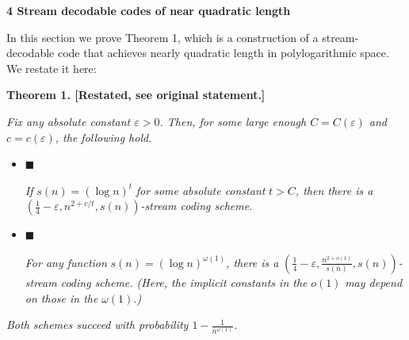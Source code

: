 \documentclass[10pt,a4paper]{article}
\begin{document}
\par\medskip\noindent\textbf{
4 Stream decodable codes of near quadratic length}\par




In this section we prove Theorem 1, which is a construction of a stream-decodable code that achieves nearly quadratic length in polylogarithmic space. We restate it here:\par






\par\medskip\noindent\textbf{
\textbf{Theorem 1}\textbf{.}
[Restated, see original statement.]}\par



\emph{Fix any absolute constant $\varepsilon>0$. Then, for some large enough
$C=C(\varepsilon)$ and $c=c(\varepsilon)$, the following hold.}\par


\begin{itemize}


\item[] 
$\blacksquare$ 


\emph{If }$s(n)=(\log n)^{t}$\emph{ for some absolute constant }$t>C$\emph{, then there is a }$\left(\frac{1}{4}-\varepsilon,n^{2+c/t},s(n)\right)$\emph{-stream coding scheme.}\par





\item[] 
$\blacksquare$ 


\emph{For any function }$s(n)=(\log n)^{\omega(1)}$\emph{, there is a }$\left(\frac{1}{4}-\varepsilon,\frac{n^{2+o(1)}}{s(n)},s(n)\right)$\emph{-stream coding scheme. (Here, the implicit constants in the }$o(1)$\emph{ may depend on those in the }$\omega(1)$\emph{.)}\par





\end{itemize}


\emph{Both schemes succeed with probability $1-\frac{1}{n^{\omega(1)}}$.}\par



\end{document}
